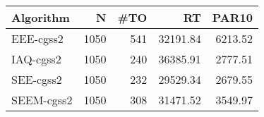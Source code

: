 \begin{tabular}{lrrrr}
\toprule
 Algorithm &    N &  \#TO &       RT &   PAR10 \\
\midrule
 EEE-cgss2 & 1050 &  541 & 32191.84 & 6213.52 \\
 IAQ-cgss2 & 1050 &  240 & 36385.91 & 2777.51 \\
 SEE-cgss2 & 1050 &  232 & 29529.34 & 2679.55 \\
SEEM-cgss2 & 1050 &  308 & 31471.52 & 3549.97 \\
\bottomrule
\end{tabular}
